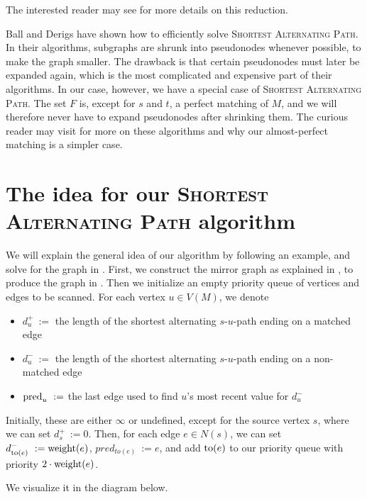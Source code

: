 The interested reader may see \cite{source:derigs_shortest_odd_path} for more details on this reduction.

Ball and Derigs \cite{source:shortest_alternating_path} have shown how to efficiently solve \textsc{Shortest Alternating Path}. In their algorithms, subgraphs are shrunk into pseudonodes whenever possible, to make the graph smaller. The drawback is that certain pseudonodes must later be expanded again, which is the most complicated and expensive part of their algorithms. In our case, however, we have a special case of \textsc{Shortest Alternating Path}. The set $F$ is, except for $s$ and $t$, a perfect matching of $M$, and we will therefore never have to expand pseudonodes after shrinking them. The curious reader may visit \cite{source:shortest_alternating_path} for more on these algorithms and why our almost-perfect matching is a simpler case.

\section{The idea for our \textsc{Shortest Alternating Path} algorithm}
We will explain the general idea of our algorithm by following an example, and solve for the graph in . First, we construct the mirror graph as explained in , to produce the graph in . Then we initialize an empty priority queue of vertices and edges to be scanned. For each vertex $u \in V(M)$, we denote
\begin{itemize}
    \item $d^+_u~:=$ the length of the shortest alternating $s$-$u$-path ending on a matched edge
    \item $d^-_u~:=$ the length of the shortest alternating $s$-$u$-path ending on a non-matched edge
    \item $\operatorname{pred}_u~:=$ the last edge used to find $u$'s most recent value for $d^-_u$
\end{itemize}

Initially, these are either $\infty$ or undefined, except for the source vertex $s$, where we can set $d^+_s~:= 0$. Then, for each edge $e \in N(s)$, we can set $d^-_{\operatorname{to}(e)}~:= \operatorname{weight}(e)$, $pred_{to(e)}~:= e$, and add $\operatorname{to}(e)$ to our priority queue with priority $2 \cdot \operatorname{weight}(e)$.

We visualize it in the diagram below.

